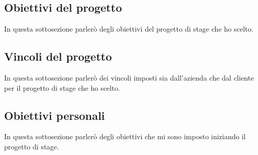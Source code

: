 \subsection{Obiettivi del progetto}
In questa sottosezione parlerò degli obiettivi del progetto di stage che ho scelto.

\subsection{Vincoli del progetto}
In questa sottosezione parlerò dei vincoli imposti sia dall'azienda che dal cliente per il progetto di stage che ho scelto.

\subsection{Obiettivi personali}
In questa sottosezione parlerò degli obiettivi che mi sono imposto iniziando il progetto di stage.
